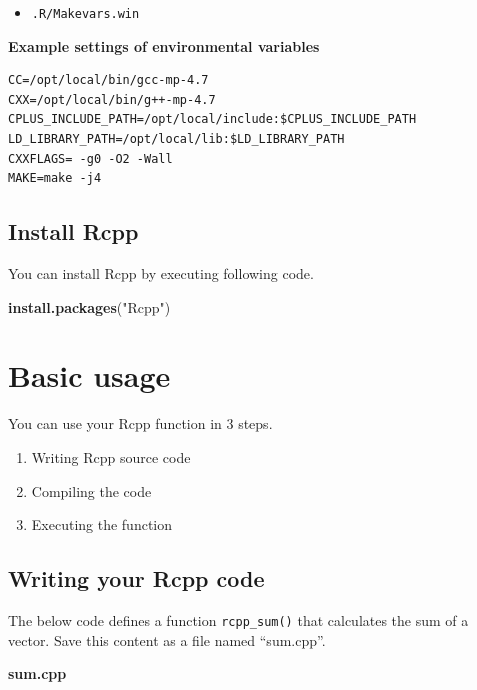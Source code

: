 \documentclass[]{book}
\newenvironment{Shaded}{\begin{snugshade}}{\end{snugshade}}
\newcommand{\KeywordTok}[1]{\textcolor[rgb]{0.13,0.29,0.53}{\textbf{#1}}}
\newcommand{\StringTok}[1]{\textcolor[rgb]{0.31,0.60,0.02}{#1}}
\newcommand{\NormalTok}[1]{#1}
\providecommand{\tightlist}{%
  \setlength{\itemsep}{0pt}\setlength{\parskip}{0pt}}
\theoremstyle{definition}
\theoremstyle{definition}
\theoremstyle{remark}
\begin{document}
\begin{itemize}
\tightlist
\item
  \texttt{.R/Makevars.win}
\end{itemize}

\textbf{Example settings of environmental variables}

\begin{verbatim}
CC=/opt/local/bin/gcc-mp-4.7
CXX=/opt/local/bin/g++-mp-4.7
CPLUS_INCLUDE_PATH=/opt/local/include:$CPLUS_INCLUDE_PATH
LD_LIBRARY_PATH=/opt/local/lib:$LD_LIBRARY_PATH
CXXFLAGS= -g0 -O2 -Wall
MAKE=make -j4
\end{verbatim}

\section{Install Rcpp}\label{install-rcpp}

You can install Rcpp by executing following code.

\begin{Shaded}
\begin{Highlighting}[]
\KeywordTok{install.packages}\NormalTok{(}\StringTok{"Rcpp"}\NormalTok{)}
\end{Highlighting}
\end{Shaded}

\chapter{Basic usage}\label{basic-usage}

You can use your Rcpp function in 3 steps.

\begin{enumerate}
\def\labelenumi{\arabic{enumi}.}
\tightlist
\item
  Writing Rcpp source code
\item
  Compiling the code
\item
  Executing the function
\end{enumerate}

\section{Writing your Rcpp code}\label{writing-your-rcpp-code}

The below code defines a function \texttt{rcpp\_sum()} that calculates
the sum of a vector. Save this content as a file named ``sum.cpp''.

\textbf{sum.cpp}
\end{document}
